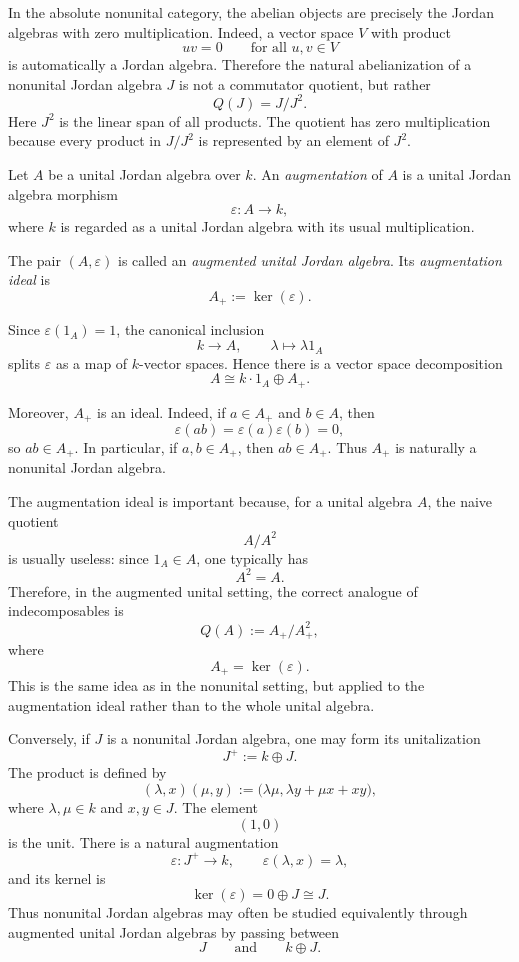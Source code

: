 \begin{note}
  In the absolute nonunital category, the abelian objects are precisely the
  Jordan algebras with zero multiplication. Indeed, a vector space \(V\) with
  product
  \[
      uv = 0
      \qquad
      \text{for all }u,v\in V
  \]
  is automatically a Jordan algebra. Therefore the natural abelianization of a
  nonunital Jordan algebra \(J\) is not a commutator quotient, but rather
  \[
      Q(J)=J/J^2.
  \]
  Here \(J^2\) is the linear span of all products. The quotient has zero
  multiplication because every product in \(J/J^2\) is represented by an element
  of \(J^2\).

  Let \(A\) be a unital Jordan algebra over \(k\). An \emph{augmentation} of \(A\)
is a unital Jordan algebra morphism
\[
    \varepsilon : A \longrightarrow k,
\]
where \(k\) is regarded as a unital Jordan algebra with its usual
multiplication.

The pair \((A,\varepsilon)\) is called an \emph{augmented unital Jordan
algebra}. Its \emph{augmentation ideal} is
\[
    A_+ := \ker(\varepsilon).
\]

Since \(\varepsilon(1_A)=1\), the canonical inclusion
\[
    k \longrightarrow A,
    \qquad
    \lambda \longmapsto \lambda 1_A
\]
splits \(\varepsilon\) as a map of \(k\)-vector spaces. Hence there is a vector
space decomposition
\[
    A \cong k\cdot 1_A \oplus A_+.
\]

Moreover, \(A_+\) is an ideal. Indeed, if \(a\in A_+\) and \(b\in A\), then
\[
    \varepsilon(ab)
    =
    \varepsilon(a)\varepsilon(b)
    =
    0,
\]
so \(ab\in A_+\). In particular, if \(a,b\in A_+\), then \(ab\in A_+\).
Thus \(A_+\) is naturally a nonunital Jordan algebra.

The augmentation ideal is important because, for a unital algebra \(A\), the
naive quotient
\[
    A/A^2
\]
is usually useless: since \(1_A\in A\), one typically has
\[
    A^2=A.
\]
Therefore, in the augmented unital setting, the correct analogue of
indecomposables is
\[
    Q(A)
    :=
    A_+/A_+^2,
\]
where
\[
    A_+ = \ker(\varepsilon).
\]
This is the same idea as in the nonunital setting, but applied to the
augmentation ideal rather than to the whole unital algebra.

Conversely, if \(J\) is a nonunital Jordan algebra, one may form its
unitalization
\[
    J^{+} := k\oplus J.
\]
The product is defined by
\[
    (\lambda,x)(\mu,y)
    :=
    \bigl(
        \lambda\mu,
        \lambda y+\mu x+xy
    \bigr),
\]
where \(\lambda,\mu\in k\) and \(x,y\in J\). The element
\[
    (1,0)
\]
is the unit. There is a natural augmentation
\[
    \varepsilon : J^{+}\longrightarrow k,
    \qquad
    \varepsilon(\lambda,x)=\lambda,
\]
and its kernel is
\[
    \ker(\varepsilon)=0\oplus J\cong J.
\]
Thus nonunital Jordan algebras may often be studied equivalently through
augmented unital Jordan algebras by passing between
\[
    J
    \qquad\text{and}\qquad
    k\oplus J.
\]
\end{note}


